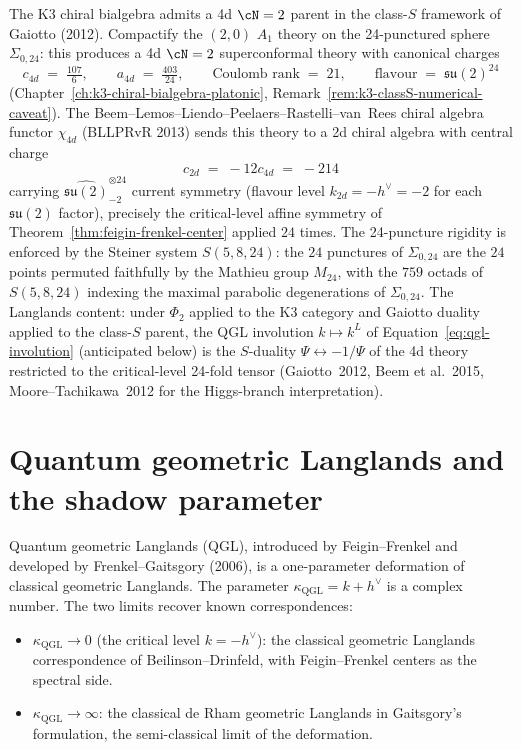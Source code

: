 \begin{remark}
\label{rem:gl-class-s-parent}
The K3 chiral bialgebra admits a 4d $\cN=2$ parent in the class-$S$ framework of Gaiotto (2012). Compactify the $(2,0)$ $A_1$ theory on the 24-punctured sphere $\Sigma_{0,24}$: this produces a 4d $\cN=2$ superconformal theory with canonical charges
\[
 c_{4d} \;=\; \tfrac{107}{6}, \qquad a_{4d} \;=\; \tfrac{403}{24}, \qquad
 \text{Coulomb rank} \;=\; 21, \qquad
 \text{flavour} \;=\; \mathfrak{su}(2)^{24}
\]
(Chapter~\ref{ch:k3-chiral-bialgebra-platonic},
Remark~\ref{rem:k3-classS-numerical-caveat}).
The Beem--Lemos--Liendo--Peelaers--Rastelli--van~Rees chiral algebra functor $\chi_{4d}$ (BLLPRvR 2013) sends this theory to a 2d chiral algebra with central charge
\[
 c_{2d} \;=\; -12 c_{4d} \;=\; -214
\]
carrying $\widehat{\mathfrak{su}(2)}_{-2}^{\otimes 24}$ current symmetry (flavour level $k_{2d} = -h^\vee = -2$ for each $\mathfrak{su}(2)$ factor), precisely the critical-level affine symmetry of Theorem~\ref{thm:feigin-frenkel-center} applied $24$ times. The 24-puncture rigidity is enforced by the Steiner system $S(5,8,24)$: the $24$ punctures of $\Sigma_{0,24}$ are the $24$ points permuted faithfully by the Mathieu group $M_{24}$, with the $759$ octads of $S(5,8,24)$ indexing the maximal parabolic degenerations of $\Sigma_{0,24}$. The Langlands content: under $\Phi_2$ applied to the K3 category and Gaiotto duality applied to the class-$S$ parent, the QGL involution $k \mapsto k^L$ of Equation~\eqref{eq:qgl-involution} (anticipated below) is the $S$-duality $\Psi \leftrightarrow -1/\Psi$ of the 4d theory restricted to the critical-level 24-fold tensor (Gaiotto~2012, Beem et al.~2015, Moore--Tachikawa~2012 for the Higgs-branch interpretation).
\end{remark}


\section{Quantum geometric Langlands and the shadow parameter}
\label{sec:quantum-geom-langlands}

Quantum geometric Langlands (QGL), introduced by Feigin--Frenkel and developed by Frenkel--Gaitsgory (2006), is a one-parameter deformation of classical geometric Langlands. The parameter $\kappa_{\mathrm{QGL}} = k + h^\vee$ is a complex number. The two limits recover known correspondences:
\begin{itemize}
 \item $\kappa_{\mathrm{QGL}} \to 0$ (the critical level $k = -h^\vee$): the classical geometric Langlands correspondence of Beilinson--Drinfeld, with Feigin--Frenkel centers as the spectral side.
 \item $\kappa_{\mathrm{QGL}} \to \infty$: the classical de Rham geometric Langlands in Gaitsgory's formulation, the semi-classical limit of the deformation.
\end{itemize}

